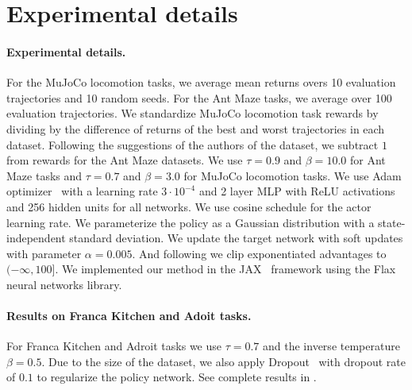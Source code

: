 \documentclass{article} %
\begin{document}
\section{Experimental details}

\label{app:experiments}


\paragraph{Experimental details.} For the MuJoCo locomotion tasks, we average mean returns overs 10 evaluation trajectories and 10 random seeds. For the Ant Maze tasks, we average over 100 evaluation trajectories.  We standardize MuJoCo locomotion task rewards by dividing by the difference of returns of the best and worst trajectories in each dataset. Following the suggestions of the authors of the dataset, we subtract $1$ from rewards for the Ant Maze datasets. We use $\tau=0.9$ and $\beta=10.0$ for Ant Maze tasks and $\tau=0.7$ and $\beta=3.0$ for MuJoCo locomotion tasks.
We use Adam optimizer~\citep{kingma2014adam} with a learning rate $3\cdot10^{-4}$ and 2 layer MLP with ReLU activations and 256 hidden units for all networks. We use cosine schedule for the actor learning rate. We parameterize the policy as a Gaussian distribution with a state-independent standard deviation. We update the target network with soft updates with parameter $\alpha=0.005$. And following \cite{brandfonbrener2021offline} we clip exponentiated advantages to $(-\infty, 100]$. We implemented our method in the JAX~\citep{jax2018github} framework using the Flax~\citep{flax2020github} neural networks library.


\paragraph{Results on Franca Kitchen and Adoit tasks.}
For Franca Kitchen and Adroit tasks we use $\tau=0.7$ and the inverse temperature $\beta=0.5$. Due to the size of the dataset, we also apply Dropout~\citep{srivastava2014dropout} with dropout rate of $0.1$ to regularize the policy network. See complete results in .
\end{document}
